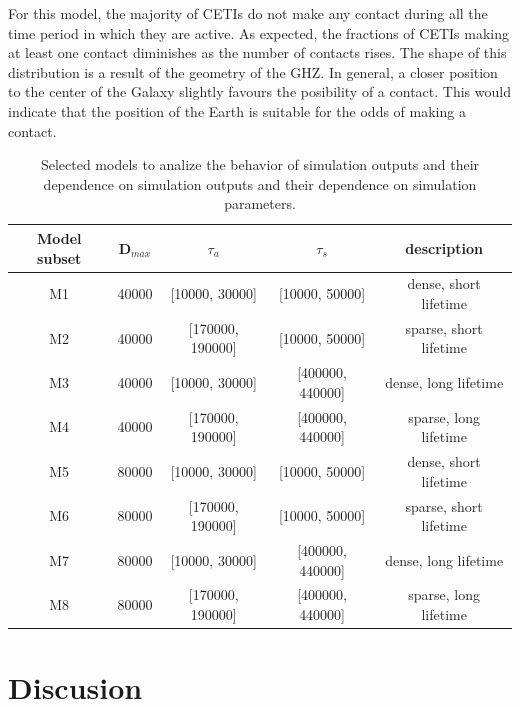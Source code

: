 \documentclass[crop]{CSLB}%
\begin{document}
%
For this model, the majority of CETIs do not
make any contact during all the time period in which they are active.
%
As expected, the fractions of CETIs making at least one contact
diminishes as the number of contacts rises.
%
The shape of this distribution is a result of the geometry of the GHZ.
%
In general, a closer position to the center of the Galaxy slightly favours 
the posibility of a contact.
%
This would indicate that the position of the Earth is suitable for the
odds of making a contact.


\setlength{\tabcolsep}{10pt}
\begin{table}
\centering
\begin{tabular}{ccccc}
\hline
Model subset & D$_{max}$ & $\tau_a$ & $\tau_s$ & description  \\
\hline
M1 & 40000 & [10000, 30000]   & [10000, 50000]   &dense, short lifetime\\
M2 & 40000 & [170000, 190000] & [10000, 50000]   &sparse, short lifetime\\
M3 & 40000 & [10000, 30000]   & [400000, 440000] &dense, long lifetime \\
M4 & 40000 & [170000, 190000] & [400000, 440000] &sparse, long lifetime\\
%
M5 & 80000 & [10000, 30000]   & [10000, 50000]   &dense, short lifetime\\
M6 & 80000 & [170000, 190000] & [10000, 50000]   &sparse, short lifetime\\
M7 & 80000 & [10000, 30000]   & [400000, 440000] &dense, long lifetime \\
M8 & 80000 & [170000, 190000] & [400000, 440000] &sparse, long lifetime\\
%
\hline
\end{tabular}
\caption{Selected models to analize the behavior of simulation outputs
   and their dependence on simulation outputs and their dependence on
   simulation parameters.}
\label{T_selected_models}
\end{table}


\section{Discusion}\label{S_discussion}
\end{document}
